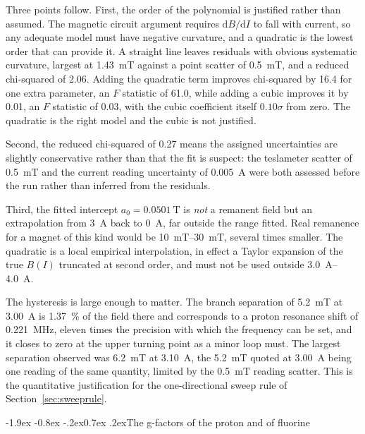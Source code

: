 \documentclass[11pt,a4paper]{article}
\makeatletter
\renewcommand\subsection{\@startsection{subsection}{2}{\z@}%
  {-1.9ex \@plus -0.8ex \@minus -.2ex}{0.7ex \@plus .2ex}{\normalfont\normalsize\bfseries}}
\makeatother
\begin{document}
Three points follow. First, the order of the polynomial is justified rather than assumed. The
magnetic circuit argument requires $\mathrm{d}B/\mathrm{d}I$ to fall with current, so any adequate
model must have negative curvature, and a quadratic is the lowest order that can provide it. A
straight line leaves residuals with obvious systematic curvature, largest at
\SI{1.43}{\milli\tesla} against a point scatter of \SI{0.5}{\milli\tesla}, and a reduced
chi-squared of 2.06. Adding the quadratic term improves chi-squared by 16.4 for one extra
parameter, an $F$ statistic of 61.0, while adding a cubic improves it by 0.01, an $F$ statistic of
0.03, with the cubic coefficient itself $0.10\sigma$ from zero. The quadratic is the right model
and the cubic is not justified.

Second, the reduced chi-squared of 0.27 means the assigned uncertainties are slightly conservative
rather than that the fit is suspect: the teslameter scatter of \SI{0.5}{\milli\tesla} and the
current reading uncertainty of \SI{0.005}{\ampere} were both assessed before the run rather than
inferred from the residuals.

Third, the fitted intercept $a_0 = \SI{0.0501}{\tesla}$ is \emph{not} a remanent field but an
extrapolation from \SI{3}{\ampere} back to \SI{0}{\ampere}, far outside the range fitted. Real
remanence for a magnet of this kind would be \SIrange{10}{30}{\milli\tesla}, several times
smaller. The quadratic is a local empirical interpolation, in effect a Taylor expansion of the true
$B(I)$ truncated at second order, and must not be used outside \SIrange{3.0}{4.0}{\ampere}.

The hysteresis is large enough to matter. The branch separation of \SI{5.2}{\milli\tesla} at
\SI{3.00}{\ampere} is \SI{1.37}{\percent} of the field there and corresponds to a proton
resonance shift of \SI{0.221}{\mega\hertz}, eleven times the precision with which the frequency
can be set, and it closes to zero at the upper turning point as a minor loop must. The largest
separation observed was \SI{6.2}{\milli\tesla} at \SI{3.10}{\ampere}, the \SI{5.2}{\milli\tesla}
quoted at \SI{3.00}{\ampere} being one reading of the same quantity, limited by the
\SI{0.5}{\milli\tesla} reading scatter. This is the
quantitative justification for the one-directional sweep rule of Section~\ref{sec:sweeprule}.

\subsection{The g-factors of the proton and of fluorine}
\label{sec:nmrfit}
\end{document}
